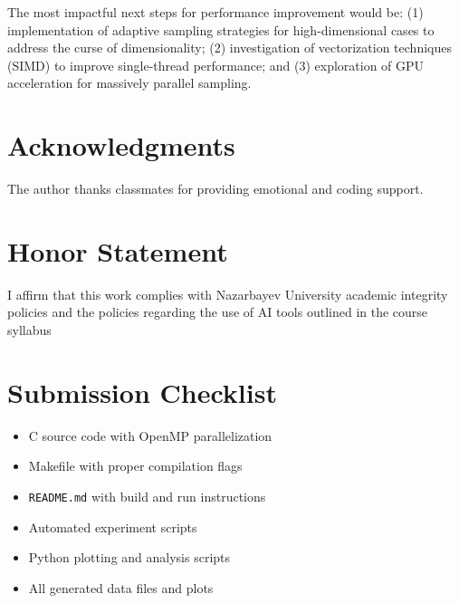 \documentclass[11pt,a4paper]{article}
\newcommand{\honor}{I affirm that this work complies with Nazarbayev University academic integrity policies and the policies regarding the use of AI tools outlined in the course syllabus}
\begin{document}
	The most impactful next steps for performance improvement would be: (1) implementation of adaptive sampling strategies for high-dimensional cases to address the curse of dimensionality; (2) investigation of vectorization techniques (SIMD) to improve single-thread performance; and (3) exploration of GPU acceleration for massively parallel sampling.
	
	\section*{Acknowledgments}
	
	The author thanks classmates for providing emotional and coding support.
	
	\section*{Honor Statement}
	\honor
	
	
	\section*{Submission Checklist}
	\begin{itemize}
		\item C source code with OpenMP parallelization
		\item Makefile with proper compilation flags
		\item \texttt{README.md} with build and run instructions
		\item Automated experiment scripts
		\item Python plotting and analysis scripts
		\item All generated data files and plots
	\end{itemize}
	
\end{document}

